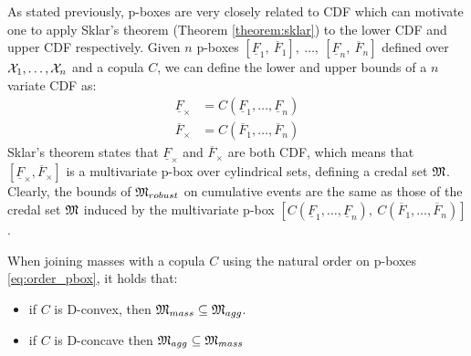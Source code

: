 As stated previously, p-boxes are very closely related to CDF which can motivate one to apply Sklar's theorem (Theorem \ref{theorem:sklar}) to the lower CDF and upper CDF respectively. Given $n$ p-boxes $[\underline{F}_1,~\overline{F}_1],~\dots,~[\underline{F}_n,~\overline{F}_n]$ defined over ${\mathcal{X}}_1,\dots,{\mathcal{X}}_n$ and a copula $C$, we can define the lower and upper bounds of a $n$ variate CDF as:
\begin{align*}
    \underline{F}_\times&=C(\underline{F}_1,\dots, \underline{F}_n)\\
    \overline{F}_\times&=C(\overline{F}_1,\dots, \overline{F}_n)
\end{align*}
Sklar's theorem states that $\underline{F}_\times$ and $\overline{F}_\times$ are both CDF, which means that $[\underline{F}_\times, \overline{F}_\times]$ is a multivariate p-box \cite{pelessoni_bivariate_2016, montes_sklars_2015} over cylindrical sets, defining a credal set ${\mathfrak{M}}$. Clearly, the bounds of ${\mathfrak{M}}_{robust}$ on cumulative events are the same as those of the credal set ${\mathfrak{M}}$ induced by the multivariate p-box $[C(\underline{F}_1,\dots, \underline{F}_n),~C(\overline{F}_1,\dots, \overline{F}_n)]$.

\begin{proposition}\label{prop:convexity_pbox}
    When joining masses with a copula $C$ using the natural order on p-boxes \eqref{eq:order_pbox}, it holds that:
    \begin{itemize}
        \item if $C$ is D-convex, then ${\mathfrak{M}}_{mass}\subseteq {\mathfrak{M}}_{agg}$.
        \item if $C$ is D-concave then ${\mathfrak{M}}_{agg}\subseteq{\mathfrak{M}}_{mass}$ 
    \end{itemize}
\end{proposition}


